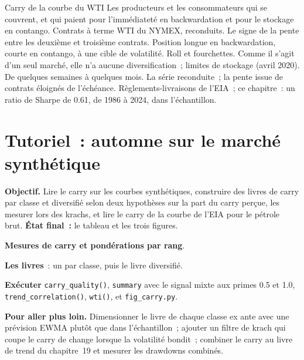 \begin{strategyfile}{Carry de la courbe du WTI}\label{strat:s1:carry-across-asset-classes:wti}
 Les producteurs et les consommateurs qui se couvrent, et qui paient pour l'immédiateté en backwardation et pour le stockage en contango.
 Contrats à terme WTI du NYMEX, reconduits.
 Le signe de la pente entre les deuxième et troisième contrats.
 Position longue en backwardation, courte en contango, à une cible de volatilité.
 Roll et fourchettes.
 Comme il s'agit d'un seul marché, elle n'a aucune diversification~; limites de stockage (avril 2020).
 De quelques semaines à quelques mois.
 La série reconduite~; la pente issue de contrats éloignés de l'échéance.
 Règlements-livraisons de l'EIA~; ce chapitre~: un ratio de Sharpe de 0.61, de 1986 à 2024, dans l'échantillon.
\end{strategyfile}

\section{Tutoriel~: automne sur le marché synthétique}\label{tut:s1:carry-across-asset-classes:tut}

\begin{tutorial}
\textbf{Objectif.} Lire le carry sur les courbes synthétiques, construire des livres de carry par classe et diversifié selon deux hypothèses sur la part du carry perçue,
les mesurer lors des krachs, et lire le carry de la courbe de l'EIA pour le pétrole brut. \textbf{État final~:} le tableau et les trois figures.
\begin{tutsteps}
\item \textbf{Mesures de carry et pondérations par rang}.
\label{lst:s1:carry-across-asset-classes:measures}
\item \textbf{Les livres}~: un par classe, puis le livre diversifié.
\label{lst:s1:carry-across-asset-classes:books}
\item \textbf{Exécuter} \texttt{carry\_quality()}, \texttt{summary} avec le signal mixte aux primes 0.5 et 1.0, \texttt{trend\_correlation()},
\texttt{wti()}, et \texttt{fig\_carry.py}.
\end{tutsteps}
\textbf{Pour aller plus loin.} Dimensionner le livre de chaque classe ex ante avec une prévision EWMA plutôt que dans l'échantillon~; ajouter un filtre de krach qui coupe le carry de change
lorsque la volatilité bondit~; combiner le carry au livre de trend du chapitre~19 et mesurer les drawdowns combinés.
\end{tutorial}

